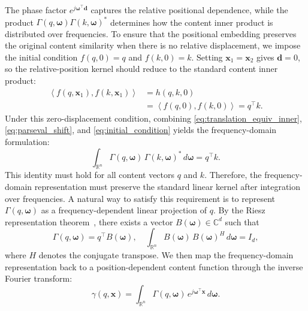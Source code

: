 \documentclass{article}
\theoremstyle{plain}
\theoremstyle{definition}
\theoremstyle{remark}
\begin{document}
The phase factor $e^{j\boldsymbol{\omega}^\top\mathbf{d}}$ captures the relative positional dependence, while the product
$\Gamma(q,\boldsymbol{\omega})\Gamma(k,\boldsymbol{\omega})^*$ determines how the content inner product is distributed over frequencies.
To ensure that the positional embedding preserves the original content similarity when there is no relative displacement, we impose the initial condition $f(q,0)=q$ and $f(k,0)=k$.
Setting $\mathbf{x}_1=\mathbf{x}_2$ gives $\mathbf{d}=0$, so the relative-position kernel should reduce to the standard content inner product:
\begin{equation}\label{eq:initial_condition}
\begin{aligned}
\left\langle f(q,\mathbf{x}_1), f(k,\mathbf{x}_1) \right\rangle
&= h(q,k,0)
\\
&= \left\langle f(q,0), f(k,0) \right\rangle
= q^\top k.
\end{aligned}
\end{equation}
Under this zero-displacement condition, combining \eqref{eq:translation_equiv_inner}, \eqref{eq:parseval_shift}, and \eqref{eq:initial_condition} yields the frequency-domain formulation:
\begin{equation}
    \int_{\mathbb{R}^n} \Gamma(q,\boldsymbol{\omega})\,
    \Gamma(k,\boldsymbol{\omega})^* \, d\boldsymbol{\omega}
    = q^\top k.
\end{equation}
This identity must hold for all content vectors $q$ and $k$. Therefore, the frequency-domain representation must preserve the standard linear kernel after integration over frequencies. A natural way to satisfy this requirement is to represent $\Gamma(q,\boldsymbol{\omega})$ as a frequency-dependent linear projection of $q$. By the Riesz representation theorem~\cite{yosida2012functional}, there exists a vector $B(\boldsymbol{\omega}) \in \mathbb{C}^d$ such that
\begin{equation}
    \Gamma(q,\boldsymbol{\omega}) = q^{\!\top} B(\boldsymbol{\omega}),
    \quad
    \int_{\mathbb{R}^n} B(\boldsymbol{\omega})\,B(\boldsymbol{\omega})^{\!H}\,d\boldsymbol{\omega} = I_d,
    \label{eq:Gamma_linear}
\end{equation}
where $H$ denotes the conjugate transpose. We then map the frequency-domain representation back to a position-dependent content function through the inverse Fourier transform:
\begin{equation}
    \gamma(q,\mathbf{x})
    = \int_{\mathbb{R}^n} \Gamma(q,\boldsymbol{\omega})\,
    e^{j\boldsymbol{\omega}^\top \mathbf{x}}\,d\boldsymbol{\omega}.
    \label{eq:gamma_def}
\end{equation}
\end{document}
